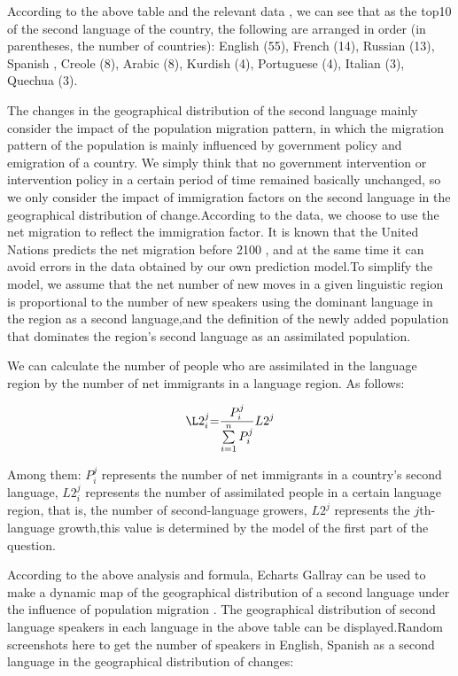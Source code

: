 \par According to the above table and the relevant data , we can see that as the top10 of the second language of the country, the following are arranged in order (in parentheses, the number of countries): English (55), French (14), Russian (13), Spanish , Creole (8), Arabic (8), Kurdish (4), Portuguese (4), Italian (3), Quechua (3).
\par The changes in the geographical distribution of the second language mainly consider the impact of the population migration pattern, in which the migration pattern of the population is mainly influenced by government policy and emigration of a country. We simply think that no government intervention or intervention policy in a certain period of time remained basically unchanged, so we only consider the impact of immigration factors on the second language in the geographical distribution of change.According to the data, we choose to use the net migration to reflect the immigration factor. It is known that the United Nations predicts the net migration before 2100 , and at the same time it can avoid errors in the data obtained by our own prediction model.To simplify the model, we assume that the net number of new moves in a given linguistic region is proportional to the number of new speakers using the dominant language in the region as a second language,and the definition of the newly added population that dominates the region's second language as an assimilated population.
\par We can calculate the number of people who are assimilated in the language region by the number of net immigrants in a language region. As follows:

\begin{equation}
\L2_i^j{\rm{ = }}\frac{{P_i^j}}{{\sum\limits_{i = 1}^n {P_i^j} }}L{2^j}\label{aa1}
\end{equation}

\noindent Among them: $P_i^j$ represents the number of net immigrants in a country's second language, $L2_i^j$ represents the number of assimilated people in a certain language region, that is, the number of second-language growers, $L{2^j}$ represents the $j$th-language growth,this value is determined by the model of the first part of the question.
\par According to the above analysis and formula, Echarts Gallray can be used to make a dynamic map of the geographical distribution of a second language under the influence of population migration . The geographical distribution of second language speakers in each language in the above table can be displayed.Random screenshots here to get the number of speakers in English, Spanish as a second language in the geographical distribution of changes:

